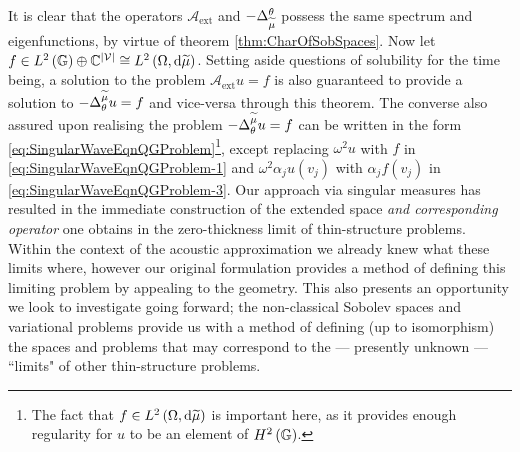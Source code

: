 It is clear that the operators $\mathcal{A}_{\mathrm{ext}}$ and $-\Delta_{\widetilde{\mu}}^{\theta}$ possess the same spectrum and eigenfunctions, by virtue of theorem \ref{thm:CharOfSobSpaces}.
Now let $f\in L^2\left( \mathbb{G} \right)\oplus\mathbb{C}^{\left\lvert \mathcal{V} \right\rvert} \cong L^{2}\left( \Omega,\mathrm{d} \widetilde{\mu} \right)$.
Setting aside questions of solubility for the time being, a solution to the problem $\mathcal{A}_{\mathrm{ext}}u=f$ is also guaranteed to provide a solution to $-\Delta_{\theta}^{\widetilde{\mu}}u=f$ and vice-versa through this theorem.
The converse also assured upon realising the problem $-\Delta_{\theta}^{\widetilde{\mu}}u=f$ can be written in the form \eqref{eq:SingularWaveEqnQGProblem}\footnote{The fact that $f\in L^{2}\left( \Omega,\mathrm{d} \widetilde{\mu} \right)$ is important here, as it provides enough regularity for $u$ to be an element of $H^2\left( \mathbb{G} \right)$.}, except replacing $\omega^2 u$ with $f$ in \eqref{eq:SingularWaveEqnQGProblem-1} and $\omega^2\alpha_j u(v_j)$ with $\alpha_j f(v_j)$ in \eqref{eq:SingularWaveEqnQGProblem-3}.
Our approach via singular measures has resulted in the immediate construction of the extended space \emph{and corresponding operator} one obtains in the zero-thickness limit of thin-structure problems.
Within the context of the acoustic approximation we already knew what these limits where, however our original formulation provides a method of defining this limiting problem by appealing to the geometry.
This also presents an opportunity we look to investigate going forward; the non-classical Sobolev spaces and variational problems provide us with a method of defining (up to isomorphism) the spaces and problems that may correspond to the --- presently unknown --- ``limits" of other thin-structure problems.